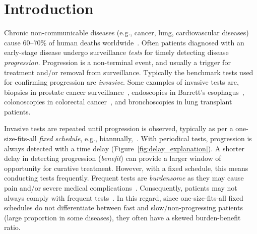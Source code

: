 \section{Introduction}
\label{sec:introduction}
Chronic non-communicable diseases (e.g., cancer, lung, cardiovascular diseases) cause 60--70\% of human deaths worldwide~\citep{world2014global}. Often patients diagnosed with an early-stage disease undergo surveillance \emph{tests} for timely detecting disease \emph{progression}. Progression is a non-terminal event, and usually a trigger for treatment and/or removal from surveillance. Typically the benchmark tests used for confirming progression are \emph{invasive}. Some examples of invasive tests are, biopsies in prostate cancer surveillance~\citep{bokhorst2015compliance}, endoscopies in Barrett's esophagus~\citep{weusten2017endoscopic}, colonoscopies in colorectal cancer~\citep{krist2007timing}, and bronchoscopies in lung transplant~\citep{mcwilliams2008surveillance} patients.

Invasive tests are repeated until progression is observed, typically as per a one-size-fits-all \emph{fixed schedule}, e.g., biannually,~\citep{mcwilliams2008surveillance,bokhorst2015compliance,krist2007timing}. With periodical tests, progression is always detected with a time delay (Figure~\ref{fig:delay_explanation}). A shorter delay in detecting progression (\emph{benefit}) can provide a larger window of opportunity for curative treatment. However, with a fixed schedule, this means conducting tests frequently. Frequent tests are \textit{burdensome} as they may cause pain and/or severe medical complications~\citep{loeb2013systematic,krist2007timing}. Consequently, patients may not always comply with frequent tests~\citep{bokhorst2015compliance, LeClercq2015325}. In this regard, since one-size-fits-all fixed schedules do not differentiate between fast and slow/non-progressing patients (large proportion in some diseases), they often have a skewed burden-benefit ratio.

